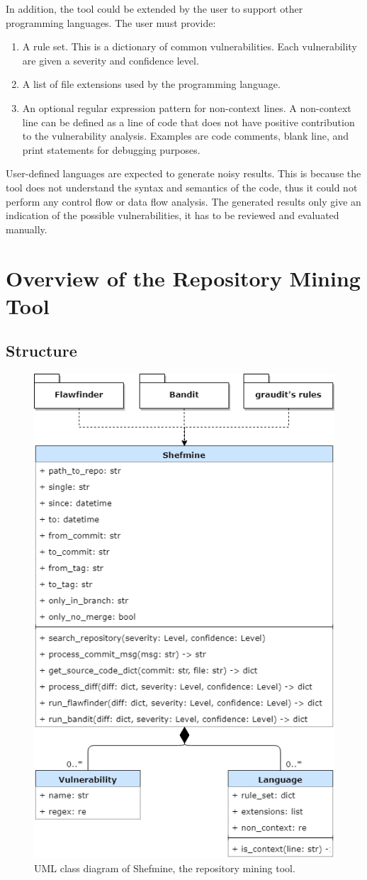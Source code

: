 \documentclass[12pt, a4paper]{report}
\begin{document}
In addition, the tool could be extended by the user to support other programming languages. The user
must provide:
\begin{enumerate}
  \item A rule set. This is a dictionary of common vulnerabilities. Each vulnerability are
  given a severity and confidence level.
  \item A list of file extensions used by the programming language.
  \item An optional regular expression pattern for non-context lines. A non-context line
  can be defined as a line of code that does not have positive contribution to the vulnerability
  analysis. Examples are code comments, blank line, and print statements for debugging purposes.
\end{enumerate}

User-defined languages are expected to generate noisy results. This is because the tool does not
understand the syntax and semantics of the code, thus it could not perform any control flow or data
flow analysis. The generated results only give an indication of the possible vulnerabilities, it has
to be reviewed and evaluated manually.

\section{Overview of the Repository Mining Tool}
\subsection{Structure}
\begin{figure}[H]
  \centering
  \includegraphics[width=.65\textwidth]{images/class_diagram.png}
  \caption{UML class diagram of Shefmine, the repository mining tool.}
  \label{figure:class_diagram}
\end{figure}
\end{document}
